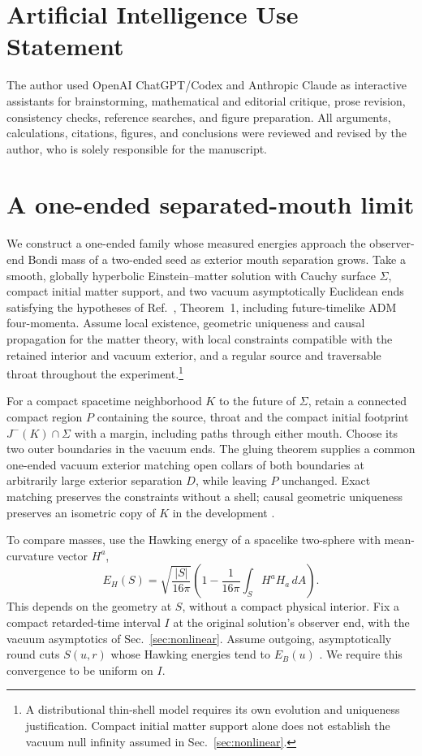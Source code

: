 \documentclass[aps,prd,10pt,onecolumn,nofootinbib,superscriptaddress,floatfix]{revtex4-2}
\begin{document}
\section*{Artificial Intelligence Use Statement}

The author used OpenAI ChatGPT/Codex and Anthropic Claude as interactive
assistants for brainstorming, mathematical and editorial critique, prose
revision, consistency checks, reference searches, and figure preparation.  All
arguments, calculations, citations, figures, and conclusions were reviewed and
revised by the author, who is solely responsible for the manuscript.

\appendix
\section{A one-ended separated-mouth limit}
\label{app:separation}

We construct a one-ended family whose measured energies approach the
observer-end Bondi mass of a two-ended seed as exterior mouth separation grows.
Take a smooth, globally hyperbolic Einstein--matter solution with
Cauchy surface $\Sigma$, compact initial matter support, and two vacuum
asymptotically Euclidean ends satisfying the hypotheses of
Ref.~\cite{ChruscielCorvinoIsenberg2011NBody}, Theorem~1,
including future-timelike ADM four-momenta.
Assume local existence, geometric uniqueness and causal propagation
for the matter theory, with local constraints compatible with the
retained interior and vacuum exterior, and a regular source and
traversable throat throughout the experiment.\footnote{A distributional thin-shell
model requires its own evolution and uniqueness justification.
Compact initial matter support alone does not establish the vacuum
null infinity assumed in Sec.~\ref{sec:nonlinear}.}

For a compact spacetime neighborhood $K$ to the future of $\Sigma$,
retain a connected compact region $P$ containing the source, throat and
the compact initial footprint $J^-(K)\cap\Sigma$ with a margin,
including paths through either mouth.  Choose its two outer boundaries
in the vacuum ends.  The gluing theorem supplies a common one-ended
vacuum exterior matching open collars of both boundaries at arbitrarily
large exterior separation $D$, while leaving $P$ unchanged.
Exact matching preserves the constraints without a shell; causal
geometric uniqueness preserves an isometric copy of $K$ in the
development \cite{Sbierski2015CauchyDevelopment}.

To compare masses, use the Hawking energy of a spacelike two-sphere
with mean-curvature vector $H^a$,
\begin{equation}
 E_H(S)=\sqrt{\frac{|S|}{16\pi}}
 \left(1-\frac{1}{16\pi}\int_S H^aH_a\,dA\right).
 \label{eq:hawking-energy}
\end{equation}
This depends on the geometry at $S$, without a compact physical interior.
Fix a compact retarded-time interval $I$ at the original solution's
observer end, with the vacuum asymptotics of Sec.~\ref{sec:nonlinear}.
Assume outgoing, asymptotically round cuts $S(u,r)$ whose Hawking energies
tend to $E_B(u)$ \cite{MarsSoria2015HawkingEnergy}.
We require this convergence to be uniform on $I$.
\end{document}
